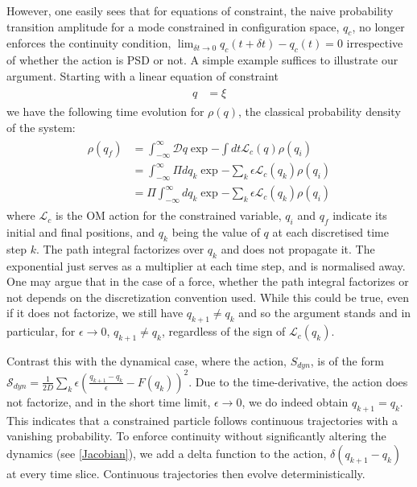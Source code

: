 \documentclass[aps,preprintnumbers,superscriptaddress,longbibliography]{revtex4-1}
\begin{document}
However, one easily sees that for equations of constraint, the naive probability transition amplitude for a mode constrained in configuration space, $q_c$, no longer enforces the continuity condition, $\lim_{\delta t\rightarrow0}q_c(t+\delta t)-q_c(t)=0$ irrespective of whether the action is PSD or not. A simple example suffices to illustrate our argument. Starting with a linear equation of constraint
\begin{align}
\begin{split}
    q&=\xi
\end{split}
\end{align}
we have the following time evolution for $\rho(q)$, the classical probability density of the system:
\begin{align}
\begin{split}
    \label{eq:ToyPI}
    \rho(q_f)&=\int^{\infty}_{-\infty} \mathcal{D}q\exp{-\int dt\mathcal{L}_{c}(q)}\rho(q_i)\\&=\int^{\infty}_{-\infty}\Pi dq_k\exp{-\sum_k\epsilon \mathcal{L}_{c}(q_k)}\rho(q_i)\\&=\Pi\int^{\infty}_{-\infty}dq_k\exp{-\sum_k\epsilon \mathcal{L}_{c}(q_k)}\rho(q_i)
\end{split}
\end{align}
where $\mathcal{L}_c$ is the OM action for the constrained variable, $q_i$ and $q_f$ indicate its initial and final positions, and  $q_k$ being the value of $q$ at each discretised time step $k$.  The path integral factorizes over $q_k$ and does not propagate it. The exponential just serves as a multiplier at each time step, and is normalised away. One may argue that in the case of a force, whether the path integral factorizes or not depends on the discretization convention used. While this could be true, even if it does not factorize, we still have $q_{k+1}\neq q_{k}$ and so the argument stands and in particular, for $\epsilon\rightarrow0$, $q_{k+1}\neq q_{k}$, regardless of the sign of $\mathcal{L}_{c}(q_k)$.

Contrast this with the dynamical case, where the action, $S_{dyn}$, is of the form $\mathcal{S}_{dyn}=\frac{1}{2D}\sum_k\epsilon (\frac{q_{k+1}-q_k}{\epsilon}-F(q_k))^2$. Due to the time-derivative, the action does not factorize, and in the short time limit, $\epsilon\rightarrow0$, we do indeed obtain $q_{k+1}=q_k$.  This indicates that a constrained particle follows continuous trajectories with a vanishing probability.
To enforce continuity without significantly altering the dynamics (see \ref{Jacobian}), we add a delta function to the action, $\delta(q_{k+1}-q_k)$ at every time slice. Continuous trajectories then evolve deterministically.
\end{document}
